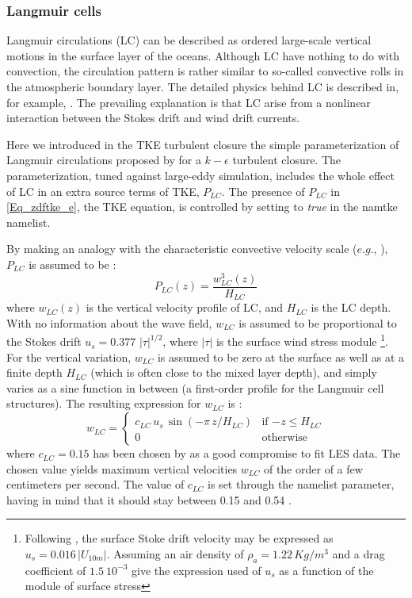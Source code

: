 \subsubsection{Langmuir cells}
Langmuir circulations (LC) can be described as ordered large-scale vertical motions 
in the surface layer of the oceans. Although LC have nothing to do with convection, 
the circulation pattern is rather similar to so-called convective rolls in the atmospheric 
boundary layer. The detailed physics behind LC is described in, for example, 
\citet{Craik_Leibovich_JFM76}. The prevailing explanation is that LC arise from 
a nonlinear interaction between the Stokes drift and wind drift currents. 

Here we introduced in the TKE turbulent closure the simple parameterization of 
Langmuir circulations proposed by \citep{Axell_JGR02} for a $k-\epsilon$ turbulent closure. 
The parameterization, tuned against large-eddy simulation, includes the whole effect
of LC in an extra source terms of TKE, $P_{LC}$.
The presence of $P_{LC}$ in \eqref{Eq_zdftke_e}, the TKE equation, is controlled 
by setting  to \textit{true} in the namtke namelist.
 
By making an analogy with the characteristic convective velocity scale 
($e.g.$, \citet{D'Alessio_al_JPO98}), $P_{LC}$ is assumed to be : 
\begin{equation}
P_{LC}(z) = \frac{w_{LC}^3(z)}{H_{LC}}
\end{equation}
where $w_{LC}(z)$ is the vertical velocity profile of LC, and $H_{LC}$ is the LC depth.
With no information about the wave field, $w_{LC}$ is assumed to be proportional to 
the Stokes drift $u_s = 0.377\,\,|\tau|^{1/2}$, where $|\tau|$ is the surface wind stress module 
\footnote{Following \citet{Li_Garrett_JMR93}, the surface Stoke drift velocity
may be expressed as $u_s =  0.016 \,|U_{10m}|$. Assuming an air density of 
$\rho_a=1.22 \,Kg/m^3$ and a drag coefficient of $1.5~10^{-3}$ give the expression 
used of $u_s$ as a function of the module of surface stress}. 
For the vertical variation, $w_{LC}$ is assumed to be zero at the surface as well as 
at a finite depth $H_{LC}$ (which is often close to the mixed layer depth), and simply 
varies as a sine function in between (a first-order profile for the Langmuir cell structures). 
The resulting expression for $w_{LC}$ is :
\begin{equation}
w_{LC}  = \begin{cases}
                   c_{LC} \,u_s \,\sin(- \pi\,z / H_{LC} )    &      \text{if $-z \leq H_{LC}$} 	\\
                   0                 				 &      \text{otherwise} 
                 \end{cases}
\end{equation}
where $c_{LC} = 0.15$ has been chosen by \citep{Axell_JGR02} as a good compromise 
to fit LES data. The chosen value yields maximum vertical velocities $w_{LC}$ of the order 
of a few centimeters per second. The value of $c_{LC}$ is set through the  
namelist parameter, having in mind that it should stay between 0.15 and 0.54 \citep{Axell_JGR02}. 

